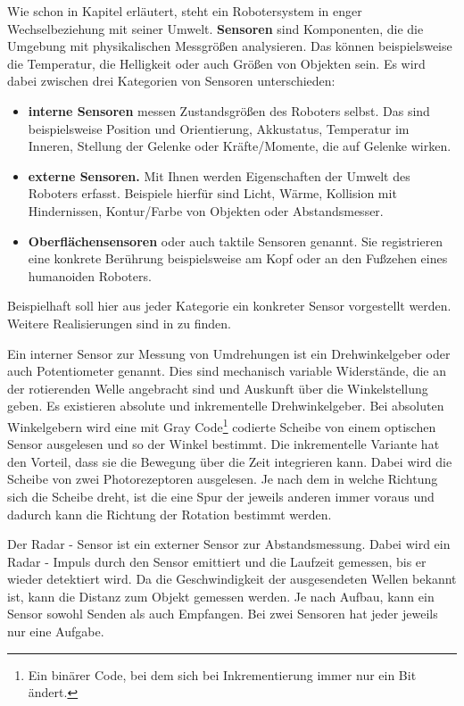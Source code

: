 Wie schon in Kapitel  erläutert, steht ein Robotersystem in enger Wechselbeziehung mit seiner Umwelt. \textbf{Sensoren} sind Komponenten, die die Umgebung mit physikalischen Messgrößen analysieren. Das können beispielsweise die Temperatur, die Helligkeit oder auch Größen von Objekten sein. Es wird dabei zwischen drei Kategorien von Sensoren unterschieden:
\begin{itemize}
\item \textbf{interne Sensoren} messen Zustandsgrößen des Roboters selbst. Das sind beispielsweise Position und Orientierung, Akkustatus, Temperatur im Inneren, Stellung der Gelenke oder Kräfte/Momente, die auf Gelenke wirken.
\item \textbf{externe Sensoren.} Mit Ihnen werden Eigenschaften der Umwelt des Roboters erfasst. Beispiele hierfür sind Licht, Wärme, Kollision mit Hindernissen, Kontur/Farbe von Objekten oder Abstandsmesser. 
\item \textbf{Oberflächensensoren} oder auch taktile Sensoren genannt. Sie registrieren eine konkrete Berührung beispielsweise am Kopf oder an den Fußzehen eines humanoiden Roboters.
\end{itemize}
Beispielhaft soll hier aus jeder Kategorie ein konkreter Sensor vorgestellt werden. Weitere Realisierungen sind in \cite{Haun2007} zu finden.

Ein interner Sensor zur Messung von Umdrehungen ist ein Drehwinkelgeber oder auch Potentiometer genannt. Dies sind mechanisch variable Widerstände, die an der rotierenden Welle angebracht sind und Auskunft über die Winkelstellung geben. Es existieren absolute und inkrementelle Drehwinkelgeber. Bei absoluten Winkelgebern wird eine mit Gray Code\footnote{Ein binärer Code, bei dem sich bei Inkrementierung immer nur ein Bit ändert.} codierte Scheibe von einem optischen Sensor ausgelesen und so der Winkel bestimmt. Die inkrementelle Variante hat den Vorteil, dass sie die Bewegung über die Zeit integrieren kann. Dabei wird die Scheibe von zwei Photorezeptoren ausgelesen. Je nach dem in welche Richtung sich die Scheibe dreht, ist die eine Spur der jeweils anderen immer voraus und dadurch kann die Richtung der Rotation bestimmt werden.

Der Radar - Sensor ist ein externer Sensor zur Abstandsmessung. Dabei wird ein Radar - Impuls durch den Sensor emittiert und die Laufzeit gemessen, bis er wieder detektiert wird. Da die Geschwindigkeit der ausgesendeten Wellen bekannt ist, kann die Distanz zum Objekt gemessen werden. Je nach Aufbau, kann ein Sensor sowohl Senden als auch Empfangen. Bei zwei Sensoren hat jeder jeweils nur eine Aufgabe.

